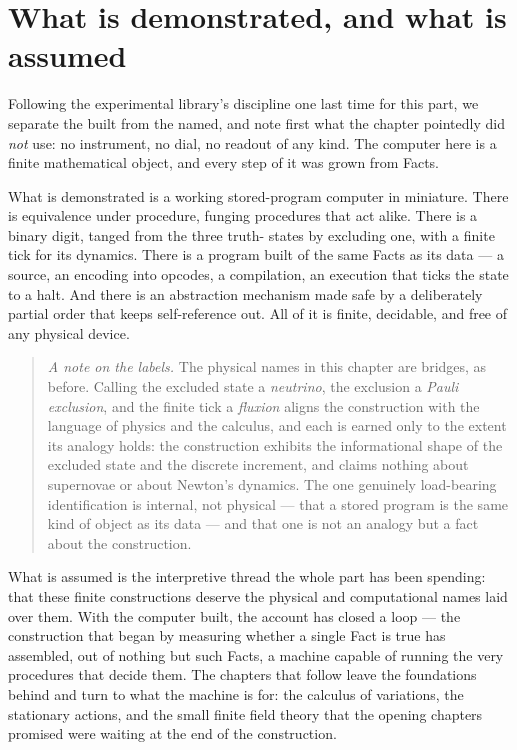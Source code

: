 \section{What is demonstrated, and what is assumed}
\label{se:demonstrated-assumed-ch6}

Following the experimental library's discipline one last time for this part, we separate the built from
the named, and note first what the chapter pointedly did \emph{not} use: no instrument, no dial, no
readout of any kind. The computer here is a finite mathematical object, and every step of it was grown
from Facts.

What is demonstrated is a working stored-program computer in miniature. There is equivalence under
procedure, funging procedures that act alike. There is a binary digit, tanged from the three truth-
states by excluding one, with a finite tick for its dynamics. There is a program built of the same
Facts as its data --- a source, an encoding into opcodes, a compilation, an execution that ticks the
state to a halt. And there is an abstraction mechanism made safe by a deliberately partial order that
keeps self-reference out. All of it is finite, decidable, and free of any physical device.

\begin{quote}
\emph{A note on the labels.} The physical names in this chapter are bridges, as before. Calling the
excluded state a \emph{neutrino}, the exclusion a \emph{Pauli exclusion}, and the finite tick a
\emph{fluxion} aligns the construction with the language of physics and the calculus, and each is
earned only to the extent its analogy holds: the construction exhibits the informational shape of the
excluded state and the discrete increment, and claims nothing about supernovae or about Newton's
dynamics. The one genuinely load-bearing identification is internal, not physical --- that a stored
program is the same kind of object as its data --- and that one is not an analogy but a fact about the
construction.

\end{quote}

What is assumed is the interpretive thread the whole part has been spending: that these finite
constructions deserve the physical and computational names laid over them. With the computer built, the
account has closed a loop --- the construction that began by measuring whether a single Fact is true has
assembled, out of nothing but such Facts, a machine capable of running the very procedures that decide
them. The chapters that follow leave the foundations behind and turn to what the machine is for: the
calculus of variations, the stationary actions, and the small finite field theory that the opening
chapters promised were waiting at the end of the construction.
